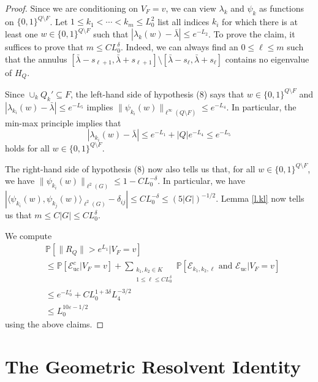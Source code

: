 \documentclass{amsart}
\newcommand{\lref}[1]{Lemma \ref{l.#1}}
\numberwithin{equation}{section}
\numberwithin{figure}{section}
\renewcommand{\P}{\mathbb{P}}
\newcommand{\ep}{\varepsilon}
\begin{document}
\begin{proof}
Since we are conditioning on $V_F = v$, we can view $\lambda_k$ and $\psi_k$ as functions on $\{ 0, 1 \}^{Q \setminus F}$.  Let $1 \leq k_1 < \cdots < k_m \leq L_0^2$ list all indices $k_i$ for which there is at least one $w \in \{ 0, 1 \}^{Q \setminus F}$ such that $|\lambda_k(w) - \bar \lambda| \leq e^{-L_2}$.  To prove the claim, it suffices to prove that $m \leq C L_0^{\delta}$.  Indeed, we can always find an $0 \leq \ell \leq m$ such that the annulus $[\bar \lambda -s_{\ell+1}, \bar \lambda + s_{\ell+1}] \setminus [\bar \lambda - s_\ell, \bar \lambda + s_\ell]$ contains no eigenvalue of $H_Q$.

Since $\cup_k Q_k' \subseteq F$, the left-hand side of hypothesis (8) says that $w \in \{ 0, 1 \}^{Q \setminus F}$ and $|\lambda_{k_i}(w) - \bar \lambda| \leq e^{-L_5}$ implies $\| \psi_{k_i}(w) \|_{\ell^\infty(Q \setminus F)} \leq e^{-L_4}$.  In particular, the min-max principle implies that
\begin{equation*}
|\lambda_{k_i}(w) - \bar \lambda| \leq e^{-L_1} + |Q| e^{-L_4} \leq e^{-L_5}
\end{equation*}
holds for all $w \in \{ 0, 1 \}^{Q \setminus F}$.

The right-hand side of hypothesis (8) now also tells us that, for all $w \in \{ 0, 1 \}^{Q \setminus F}$, we have $\| \psi_{k_i}(w) \|_{\ell^2(G)} \leq 1 - C L_0^{-\delta}$.  In particular, we have $|\langle \psi_{k_i}(w), \psi_{k_j}(w) \rangle_{\ell^2(G)} - \delta_{ij}| \leq C  L_0^{-\delta} \leq (5|G|)^{-1/2}$.  \lref{kl} now tells us that $m \leq C |G| \leq C L_0^{\delta}$.

We compute
\begin{equation*}
\begin{aligned}
& \P[\|R_Q\| > e^{L_1} | V_F = v] \\
& \leq \P[\mathcal E_{\mathrm{uc}}^c | V_F = v] + \sum_{\substack{k_1,k_2 \in K \\ 1 \leq \ell \leq C L_0^{\delta}}} \P[\mathcal E_{k_1, k_2,\ell} \mbox{ and } \mathcal E_{\mathrm{uc}} | V_F = v] \\
& \leq e^{-L_0^\ep} + C L_0^{1+3 \delta} L_4^{-3/2} \\
& \leq L_0^{10 \ep - 1/2}
\end{aligned}
\end{equation*}
using the above claims.
\end{proof}

\section{The Geometric Resolvent Identity}
\end{document}
